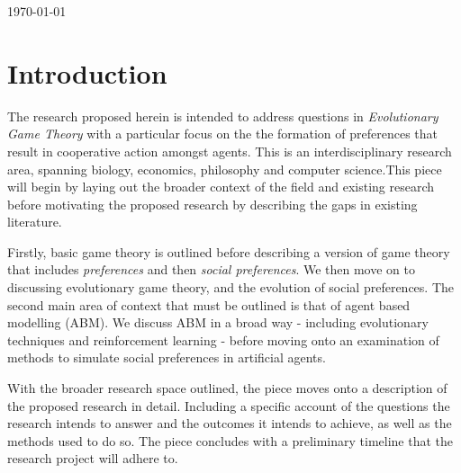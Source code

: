 \documentclass[12pt]{article}
\newcommand*{\np}{\par\noindent\newline}
\begin{document}
\begin{titlepage}
	\vfill\vfill\vfill %
	
	{\large\today} %
	
	
	 
	
	\vfill %
	
\end{titlepage}
\hypersetup{
    colorlinks,
    citecolor=black,
    filecolor=black,
    linkcolor=black,
    urlcolor=black
}
\newpage
\tableofcontents
\newpage
\section{Introduction}
The research proposed herein is intended to address questions in
\textit{Evolutionary Game Theory} with a particular focus on the the formation
of preferences that result in cooperative action amongst agents. This is an
interdisciplinary research area, spanning biology, economics, philosophy and
computer science.This piece will begin by laying out the broader context of the
field and existing research before motivating the proposed research by
describing the gaps in existing literature.
\np Firstly, basic game theory is outlined before describing a version of
game theory that includes \textit{preferences} and then \textit{social
preferences}. We then move on to discussing evolutionary game theory, and the
evolution of social preferences. The second main area of context that must be
outlined is that of agent based modelling (ABM). We discuss ABM in a broad way
- including evolutionary techniques and reinforcement learning - before moving
onto an examination of methods to simulate social preferences in artificial
agents.
\np With the broader research space outlined, the piece moves onto a
description of the proposed research in detail. Including a specific account of
the questions the research intends to answer and the outcomes it intends to
achieve, as well as the methods used to do so. The piece concludes with a
preliminary timeline that the research project will adhere to. 
\end{document}
